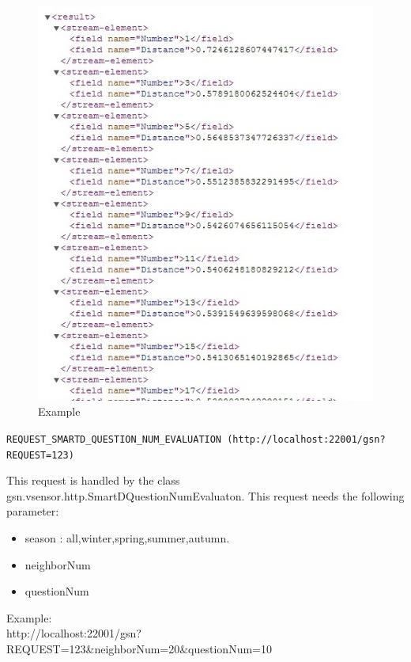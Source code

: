 \documentclass[12pt]{article}
\begin{document}
\begin{figure}
		\centering
			\includegraphics{REQUEST_SMARTD_NEIGHBOR_NUM_EVALUATION.JPG}
		\caption{Example}
\end{figure}


\vspace{1cm}

\texttt{REQUEST\_SMARTD\_QUESTION\_NUM\_EVALUATION (http://localhost:22001/gsn?REQUEST=123)}

\vspace{0.5cm}

This request is handled by the class gsn.vsensor.http.SmartDQuestionNumEvaluaton.  This request needs the following parameter: 

\begin{itemize}
  \item season : all,winter,spring,summer,autumn.
  \item neighborNum 
  \item questionNum
\end{itemize}
      
Example:  \\
  
http://localhost:22001/gsn?REQUEST=123\&neighborNum=20\&questionNum=10\\
\end{document}
